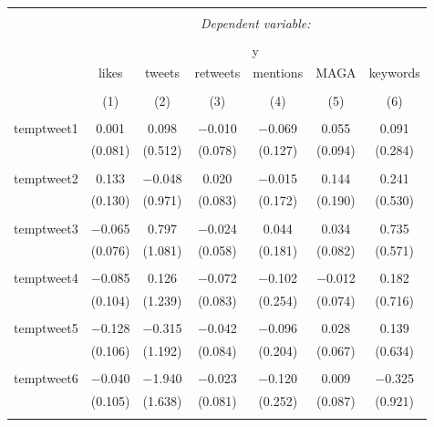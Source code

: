 
\begin{table}[!htbp] \centering 
  \caption{} 
  \label{} 
\begin{tabular}{@{\extracolsep{5pt}}lcccccc} 
\\[-1.8ex]\hline 
\hline \\[-1.8ex] 
 & \multicolumn{6}{c}{\textit{Dependent variable:}} \\ 
\cline{2-7} 
\\[-1.8ex] & \multicolumn{6}{c}{y} \\ 
 & likes & tweets & retweets & mentions & MAGA & keywords \\ 
\\[-1.8ex] & (1) & (2) & (3) & (4) & (5) & (6)\\ 
\hline \\[-1.8ex] 
 temptweet1 & 0.001 & 0.098 & $-$0.010 & $-$0.069 & 0.055 & 0.091 \\ 
  & (0.081) & (0.512) & (0.078) & (0.127) & (0.094) & (0.284) \\ 
  & & & & & & \\ 
 temptweet2 & 0.133 & $-$0.048 & 0.020 & $-$0.015 & 0.144 & 0.241 \\ 
  & (0.130) & (0.971) & (0.083) & (0.172) & (0.190) & (0.530) \\ 
  & & & & & & \\ 
 temptweet3 & $-$0.065 & 0.797 & $-$0.024 & 0.044 & 0.034 & 0.735 \\ 
  & (0.076) & (1.081) & (0.058) & (0.181) & (0.082) & (0.571) \\ 
  & & & & & & \\ 
 temptweet4 & $-$0.085 & 0.126 & $-$0.072 & $-$0.102 & $-$0.012 & 0.182 \\ 
  & (0.104) & (1.239) & (0.083) & (0.254) & (0.074) & (0.716) \\ 
  & & & & & & \\ 
 temptweet5 & $-$0.128 & $-$0.315 & $-$0.042 & $-$0.096 & 0.028 & 0.139 \\ 
  & (0.106) & (1.192) & (0.084) & (0.204) & (0.067) & (0.634) \\ 
  & & & & & & \\ 
 temptweet6 & $-$0.040 & $-$1.940 & $-$0.023 & $-$0.120 & 0.009 & $-$0.325 \\ 
  & (0.105) & (1.638) & (0.081) & (0.252) & (0.087) & (0.921) \\ 
  & & & & & & \\ 

\end{tabular}
\end{table}

